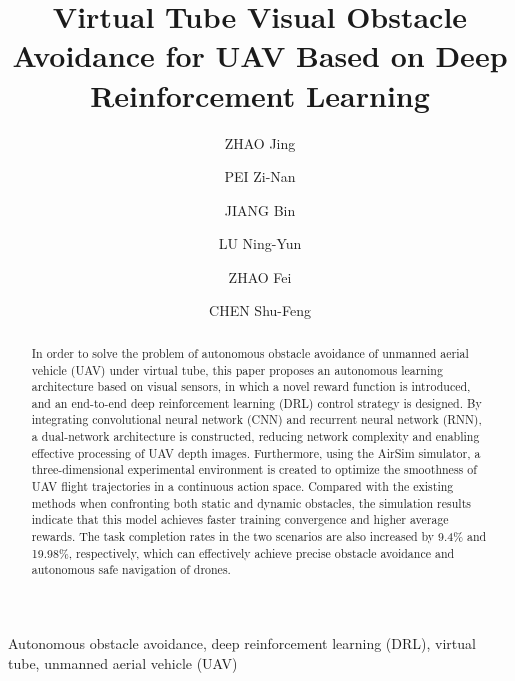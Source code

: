\documentclass[preprint,12pt,authoryear]{elsarticle}
\title{Virtual Tube Visual Obstacle Avoidance for UAV Based on Deep Reinforcement Learning}
\author[1]{ZHAO Jing}
\author[1]{PEI Zi-Nan}
\author[2]{JIANG Bin}
\author[2]{LU Ning-Yun}
\author[3]{ZHAO Fei}
\author[4]{CHEN Shu-Feng}
\begin{document}
\begin{frontmatter}

\begin{abstract}
In order to solve the problem of autonomous obstacle avoidance of unmanned aerial vehicle (UAV) under virtual tube, this paper proposes an autonomous learning architecture based on visual sensors, in which a novel reward function is introduced, and an end-to-end deep reinforcement learning (DRL) control strategy is designed. By integrating convolutional neural network (CNN) and recurrent neural network (RNN), a dual-network architecture is constructed, reducing network complexity and enabling effective processing of UAV depth images. Furthermore, using the AirSim simulator, a three-dimensional experimental environment is created to optimize the smoothness
of UAV flight trajectories in a continuous action space. Compared with the existing methods when confronting both static and dynamic obstacles, the simulation results indicate that this model achieves faster training convergence and higher average rewards. The task completion rates in the two scenarios are also increased by 9.4\% and 19.98\%, respectively, which can effectively achieve precise obstacle avoidance and autonomous safe navigation of drones.
\end{abstract}

\begin{keyword}
Autonomous obstacle avoidance, deep reinforcement learning (DRL), virtual tube, unmanned aerial vehicle (UAV)
\end{keyword}

\end{frontmatter}
\end{document}
